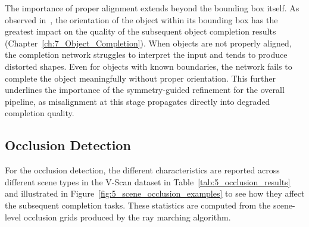 The importance of proper alignment extends beyond the bounding box itself. As observed in~\cite{vermandere_guided_2025}, the orientation of the object within its bounding box has the greatest impact on the quality of the subsequent object completion results (Chapter~\ref{ch:7_Object_Completion}). When objects are not properly aligned, the completion network struggles to interpret the input and tends to produce distorted shapes. Even for objects with known boundaries, the network fails to complete the object meaningfully without proper orientation. This further underlines the importance of the symmetry-guided refinement for the overall pipeline, as misalignment at this stage propagates directly into degraded completion quality.

\subsection{Occlusion Detection}
\label{sec:5_exp_occlusion}

For the occlusion detection, the different characteristics are reported across different scene types in the V-Scan dataset in Table~\ref{tab:5_occlusion_results} and illustrated in Figure~\ref{fig:5_scene_occlusion_examples} to see how they affect the subsequent completion tasks. These statistics are computed from the scene-level occlusion grids produced by the ray marching algorithm.

\begin{table}[h]
    \centering
    \caption[Occlusion statistics per environment type]{Occlusion statistics per V-Scan environment type, computed from the scene-level voxel grids produced by ray marching. Percentages refer to the fraction of the scene voxel grid classified as occupied or occluded. Values are reported as mean $\pm$ standard deviation across all scenes of each type.}
    \label{tab:5_occlusion_results}
\end{table}

